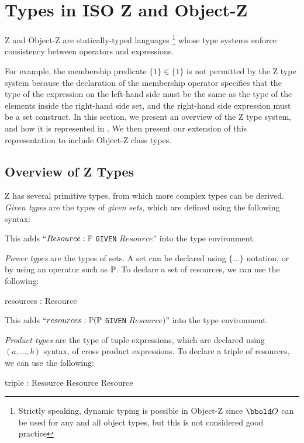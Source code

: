 \section{Types in ISO Z and Object-Z}

Z and Object-Z are statically-typed languages
\footnote{Strictly speaking, dynamic typing is possible in Object-Z
since $\oid$ can be used for any and all object types, but this is not
considered good practice} whose type systems enforce consistency
between operators and expressions.

For example, the membership predicate $\{1\} \in \{1\}$ is not
permitted by the Z type system because the declaration of the
membership operator specifies that the type of the expression on the
left-hand side must be the same as the type of the elements inside the
right-hand side set, and the right-hand side expression must be a set
construct.  In this section, we present an overview of the Z type
system, and how it is represented in \theStandard. We then present
our extension of this representation to include Object-Z class types.

\subsection{Overview of Z Types}

Z has several primitive types, from which more complex types can be
derived. {\em Given types} are the types of {\em given sets}, which are
defined using the following syntax:
\begin{zed}
  [Resource]
\end{zed}

This adds ``$Resource : \power$ {\tt GIVEN} $Resource$'' into the type
environment.

{\em Power types} are the types of sets. A set can be declared using
$\{\ldots\}$ notation, or by using an operator such as $\power$. To
declare a set of resources, we can use the following:
\begin{axdef}
  resources : \power Resource
\end{axdef}

This adds ``$resources : \power (\power$ {\tt GIVEN}
$Resource)$'' into the type environment.

{\em Product types} are the type of tuple expressions, which are
declared using $(a, \ldots, b)$ syntax, of cross product expressions. To
declare a triple of resources, we can use the following:
\begin{axdef}
   triple : Resource \cross Resource \cross Resource
\end{axdef}

